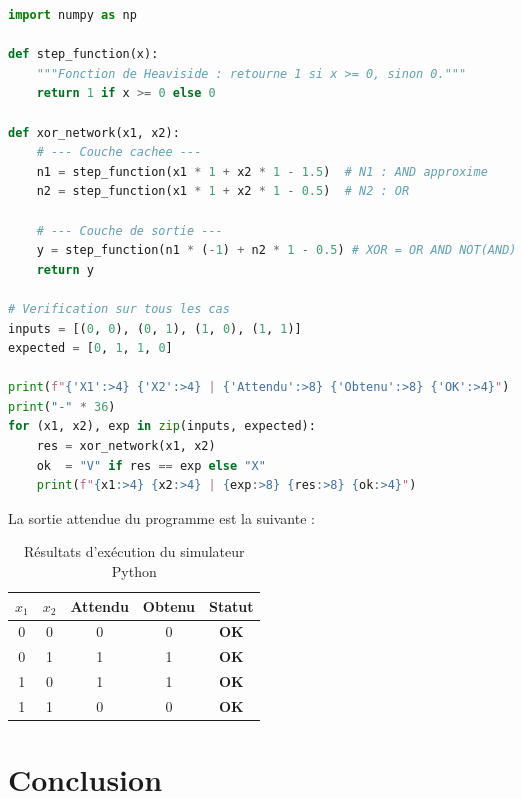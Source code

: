 \documentclass[12pt, a4paper]{article}
\begin{document}
\begin{lstlisting}[language=Python, caption={Simulateur du réseau XOR -- Python/NumPy}, label=lst:xor]
import numpy as np

def step_function(x):
    """Fonction de Heaviside : retourne 1 si x >= 0, sinon 0."""
    return 1 if x >= 0 else 0

def xor_network(x1, x2):
    # --- Couche cachee ---
    n1 = step_function(x1 * 1 + x2 * 1 - 1.5)  # N1 : AND approxime
    n2 = step_function(x1 * 1 + x2 * 1 - 0.5)  # N2 : OR

    # --- Couche de sortie ---
    y = step_function(n1 * (-1) + n2 * 1 - 0.5) # XOR = OR AND NOT(AND)
    return y

# Verification sur tous les cas
inputs = [(0, 0), (0, 1), (1, 0), (1, 1)]
expected = [0, 1, 1, 0]

print(f"{'X1':>4} {'X2':>4} | {'Attendu':>8} {'Obtenu':>8} {'OK':>4}")
print("-" * 36)
for (x1, x2), exp in zip(inputs, expected):
    res = xor_network(x1, x2)
    ok  = "V" if res == exp else "X"
    print(f"{x1:>4} {x2:>4} | {exp:>8} {res:>8} {ok:>4}")
\end{lstlisting}

La sortie attendue du programme est la suivante :

\begin{table}[H]
    \centering
    \caption{Résultats d'exécution du simulateur Python}
    \label{tab:results}
    \renewcommand{\arraystretch}{1.4}
    \begin{tabular}{ccccc}
        \toprule
        \rowcolor{espblue!15}
        \textbf{$x_1$} & \textbf{$x_2$} & \textbf{Attendu} & \textbf{Obtenu} & \textbf{Statut} \\
        \midrule
        0 & 0 & 0 & 0 & \textcolor{codegreen!60!black}{\textbf{OK}} \\
        0 & 1 & 1 & 1 & \textcolor{codegreen!60!black}{\textbf{OK}} \\
        1 & 0 & 1 & 1 & \textcolor{codegreen!60!black}{\textbf{OK}} \\
        1 & 1 & 0 & 0 & \textcolor{codegreen!60!black}{\textbf{OK}} \\
        \bottomrule
    \end{tabular}
\end{table}

\section*{Conclusion}
\end{document}
